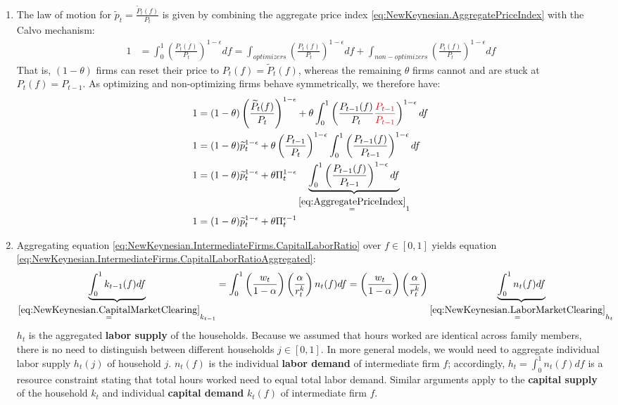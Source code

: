 \begin{enumerate}
\item The law of motion for $\widetilde{p}_t=\frac{\widetilde{P}_t(f)}{P_t}$ is given by combining the aggregate price index \eqref{eq:NewKeynesian.AggregatePriceIndex} with the Calvo mechanism:
\begin{align*}
1 &= \int_{0}^{1} \left(\frac{P_t(f)}{P_t}\right)^{1-\epsilon}df
= \int_{optimizers} \left(\frac{P_t(f)}{P_t}\right)^{1-\epsilon} df  + \int_{non-optimizers} \left(\frac{P_t(f)}{P_t}\right)^{1-\epsilon} df
\end{align*}
That is, $(1-\theta)$ firms can reset their price to $P_t(f) = \widetilde{P}_t(f)$,
  whereas the remaining $\theta$ firms cannot and are stuck at $P_t(f)=P_{t-1}$.
As optimizing and non-optimizing firms behave symmetrically, we therefore have:
\begin{align*}
1&= (1-\theta) \left(\frac{\widetilde{P}_t(f)}{P_t}\right)^{1-\epsilon} + \theta \int_{0}^1 \left(\frac{P_{t-1}(f)}{P_t}{\color{red}{\frac{P_{t-1}}{P_{t-1}}}}\right)^{1-\epsilon}df\\
1&= (1-\theta) \widetilde{p}_t^{1-\epsilon} + \theta \left(\frac{P_{t-1}}{P_{t}}\right)^{1-\epsilon} \int_{0}^1 \left(\frac{P_{t-1}(f)}{P_{t-1}}\right)^{1-\epsilon}df\\
1&=(1-\theta) \widetilde{p}_t^{1-\epsilon}  + \theta \Pi_t^{1-\epsilon} \underbrace{\int_{0}^{1} \left(\frac{P_{t-1}(f)}{P_{t-1}} \right)^{1-\epsilon}df}_{\overset{\eqref{eq:AggregatePriceIndex}}{=}1}\\
1&=(1-\theta) \widetilde{p}_t^{1-\epsilon}  + \theta \Pi_t^{\epsilon-1}
\end{align*}

\item Aggregating equation \eqref{eq:NewKeynesian.IntermediateFirms.CapitalLaborRatio} over $f\in[0,1]$ yields equation \eqref{eq:NewKeynesian.IntermediateFirms.CapitalLaborRatioAggregated}:
\begin{align*}
\underbrace{\int_0^1 k_{t-1}(f)df}_{\overset{\eqref{eq:NewKeynesian.CapitalMarketClearing}}{=}k_{t-1}} 
= \int_0^1 \left(\frac{w_t}{1-\alpha}\right) \left(\frac{\alpha}{r^k_t}\right) n_t(f) df
= \left(\frac{w_t}{1-\alpha}\right) \left(\frac{\alpha}{r^k_t}\right) \underbrace{\int_0^1 n_{t}(f)df}_{\overset{\eqref{eq:NewKeynesian.LaborMarketClearing}}{=}h_{t}}
\end{align*}
$h_t$ is the aggregated \textbf{labor supply} of the households.
Because we assumed that hours worked are identical across family members, there is no need to distinguish between different households $j\in[0,1]$.
In more general models, we would need to aggregate individual labor supply $h_t(j)$ of household $j$.
$n_t(f)$ is the individual \textbf{labor demand} of intermediate firm $f$;
  accordingly, $h_t = \int_0^1 n_t(f) df$ is a resource constraint stating that total hours worked need to equal total labor demand.
Similar arguments apply to the \textbf{capital supply} of the household $k_t$ and individual \textbf{capital demand} $k_t(f)$ of intermediate firm $f$.


\end{enumerate}
